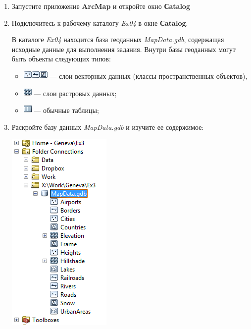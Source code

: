 \documentclass[]{book}
\providecommand{\tightlist}{%
  \setlength{\itemsep}{0pt}\setlength{\parskip}{0pt}}
\theoremstyle{definition}
\theoremstyle{definition}
\theoremstyle{definition}
\theoremstyle{remark}
\begin{document}
\begin{enumerate}
\def\labelenumi{\arabic{enumi}.}
\item
  Запустите приложение \textbf{ArcMap} и откройте окно \textbf{Сatalog}
\item
  Подключитесь к рабочему каталогу \emph{Ex04} в окне \textbf{Сatalog}.

  В каталоге \emph{Ex04} находится база геоданных \emph{MapData.gdb},
  содержащая исходные данные для выполнения задания. Внутри базы
  геоданных могут быть объекты следующих типов:

  \begin{itemize}
  \tightlist
  \item
    \includegraphics{images/Ex04/image5.png}\includegraphics{images/Ex04/image6.png}\includegraphics{images/Ex04/image7.png}
    --- слои векторных данных (классы пространственных объектов),
  \item
    \includegraphics{images/Ex04/image8.png} --- слои растровых данных;
  \item
    \includegraphics{images/Ex04/image9.png} --- обычные таблицы;
  \end{itemize}
\item
  Раскройте базу данных \emph{MapData.gdb} и изучите ее содержимое:

  \includegraphics{images/Ex04/image10.png}
\end{enumerate}
\end{document}
